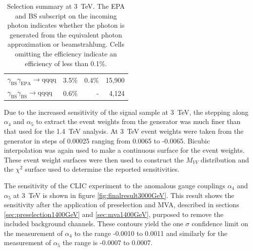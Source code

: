 \begin{table}[h!]
\begin{tabular}{ l r r r }
$\gamma_{\text{BS}}\gamma_{\text{EPA}} \rightarrow \text{qqqq}$ & 3.5\% & 0.4\% & 15,900 \\
$\gamma_{\text{BS}}\gamma_{\text{BS}} \rightarrow \text{qqqq}$ & 0.6\% & - & 4,124 \\
\hline
\end{tabular}
\caption[Selection summary at 3~TeV.  The EPA and BS subscript on the incoming photon indicates whether the photon is generated from the equivalent photon approximation or beamstrahlung.  Cells omitting the efficiency indicate an efficiency of less than 0.1\%.]{Selection summary at 3~TeV.  The EPA and BS subscript on the incoming photon indicates whether the photon is generated from the equivalent photon approximation or beamstrahlung.  Cells omitting the efficiency indicate an efficiency of less than 0.1\%.}
\label{table:selectionsummary3000GeV}
\end{table}

Due to the increased sensitivity of the signal sample at 3~TeV, the stepping along $\alpha_{4}$ and $\alpha_{5}$ to extract the event weights from the generator was much finer than that used for the 1.4~TeV analysis.  At 3~TeV event weights were taken from the generator in steps of 0.00025 ranging from 0.0065 to -0.0065.  Bicubic interpolation was again used to make a continuous surface for the event weights.  These event weight surfaces were then used to construct the $M_{VV}$ distribution and the $\chi^{2}$ surface used to determine the reported sensitivities.

The sensitivity of the CLIC experiment to the anomalous gauge couplings $\alpha_{4}$ and $\alpha_{5}$ at 3~TeV is shown in figure \ref{fig:finalresult3000GeV}.  This result shows the sensitivity after the application of preselection and MVA, described in sections \ref{sec:preselection1400GeV} and \ref{sec:mva1400GeV}, purposed to remove the included background channels.  These contours yield the one $\sigma$ confidence limit on the measurement of $\alpha_{4}$ to the range -0.0010 to 0.0011 and similarly for the measurement of $\alpha_{5}$ the range is -0.0007 to 0.0007.

